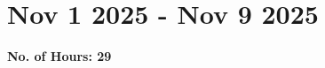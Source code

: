\documentclass[12pt]{article}
\begin{document}
    
    
    \section{Nov 1 2025 - Nov 9 2025}
    {\bf No. of Hours: 29}
    
\end{document}
